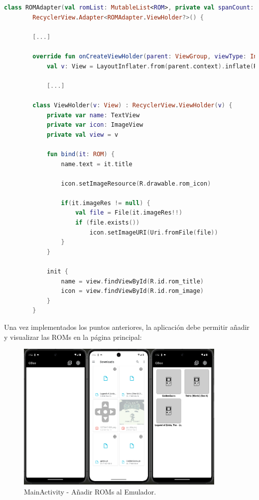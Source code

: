 \begin{lstlisting}[language=Kotlin, caption={ROM Adapter.}, label={code:romAdapter}]
    class ROMAdapter(val romList: MutableList<ROM>, private val spanCount: Int)  :
        RecyclerView.Adapter<ROMAdapter.ViewHolder?>() {

        [...]

        override fun onCreateViewHolder(parent: ViewGroup, viewType: Int): ViewHolder {
            val v: View = LayoutInflater.from(parent.context).inflate(R.layout.rom_grid_item, parent, false)

            [...]

        class ViewHolder(v: View) : RecyclerView.ViewHolder(v) {
            private var name: TextView
            private var icon: ImageView
            private val view = v

            fun bind(it: ROM) {
                name.text = it.title

                icon.setImageResource(R.drawable.rom_icon)

                if(it.imageRes != null) {
                    val file = File(it.imageRes!!)
                    if (file.exists())
                        icon.setImageURI(Uri.fromFile(file))
                }
            }

            init {
                name = view.findViewById(R.id.rom_title)
                icon = view.findViewById(R.id.rom_image)
            }
        }
\end{lstlisting}

Una vez implementados los puntos anteriores, la aplicación debe permitir añadir y visualizar las ROMs en la página principal:

\begin{figure}[H]
    \centering
    \includegraphics[width=0.9\textwidth]{include/images/add_rom.png}
    \caption{MainActivity - Añadir ROMs al Emulador.}\label{figure:addRom}
\end{figure}

